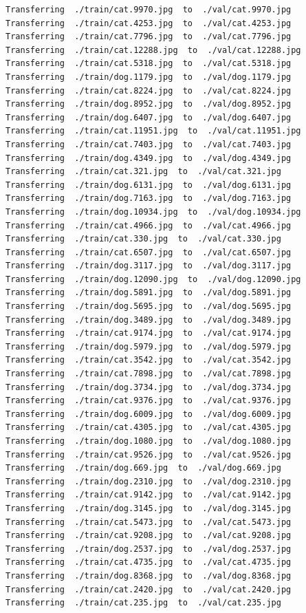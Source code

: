 \documentclass[]{book}
\theoremstyle{definition}
\theoremstyle{definition}
\theoremstyle{definition}
\theoremstyle{remark}
\begin{document}
\begin{verbatim}
Transferring  ./train/cat.9970.jpg  to  ./val/cat.9970.jpg
Transferring  ./train/cat.4253.jpg  to  ./val/cat.4253.jpg
Transferring  ./train/cat.7796.jpg  to  ./val/cat.7796.jpg
Transferring  ./train/cat.12288.jpg  to  ./val/cat.12288.jpg
Transferring  ./train/cat.5318.jpg  to  ./val/cat.5318.jpg
Transferring  ./train/dog.1179.jpg  to  ./val/dog.1179.jpg
Transferring  ./train/cat.8224.jpg  to  ./val/cat.8224.jpg
Transferring  ./train/dog.8952.jpg  to  ./val/dog.8952.jpg
Transferring  ./train/dog.6407.jpg  to  ./val/dog.6407.jpg
Transferring  ./train/cat.11951.jpg  to  ./val/cat.11951.jpg
Transferring  ./train/cat.7403.jpg  to  ./val/cat.7403.jpg
Transferring  ./train/dog.4349.jpg  to  ./val/dog.4349.jpg
Transferring  ./train/cat.321.jpg  to  ./val/cat.321.jpg
Transferring  ./train/dog.6131.jpg  to  ./val/dog.6131.jpg
Transferring  ./train/dog.7163.jpg  to  ./val/dog.7163.jpg
Transferring  ./train/dog.10934.jpg  to  ./val/dog.10934.jpg
Transferring  ./train/cat.4966.jpg  to  ./val/cat.4966.jpg
Transferring  ./train/cat.330.jpg  to  ./val/cat.330.jpg
Transferring  ./train/cat.6507.jpg  to  ./val/cat.6507.jpg
Transferring  ./train/dog.3117.jpg  to  ./val/dog.3117.jpg
Transferring  ./train/dog.12090.jpg  to  ./val/dog.12090.jpg
Transferring  ./train/dog.5891.jpg  to  ./val/dog.5891.jpg
Transferring  ./train/dog.5695.jpg  to  ./val/dog.5695.jpg
Transferring  ./train/dog.3489.jpg  to  ./val/dog.3489.jpg
Transferring  ./train/cat.9174.jpg  to  ./val/cat.9174.jpg
Transferring  ./train/dog.5979.jpg  to  ./val/dog.5979.jpg
Transferring  ./train/cat.3542.jpg  to  ./val/cat.3542.jpg
Transferring  ./train/cat.7898.jpg  to  ./val/cat.7898.jpg
Transferring  ./train/dog.3734.jpg  to  ./val/dog.3734.jpg
Transferring  ./train/cat.9376.jpg  to  ./val/cat.9376.jpg
Transferring  ./train/dog.6009.jpg  to  ./val/dog.6009.jpg
Transferring  ./train/cat.4305.jpg  to  ./val/cat.4305.jpg
Transferring  ./train/dog.1080.jpg  to  ./val/dog.1080.jpg
Transferring  ./train/cat.9526.jpg  to  ./val/cat.9526.jpg
Transferring  ./train/dog.669.jpg  to  ./val/dog.669.jpg
Transferring  ./train/dog.2310.jpg  to  ./val/dog.2310.jpg
Transferring  ./train/cat.9142.jpg  to  ./val/cat.9142.jpg
Transferring  ./train/dog.3145.jpg  to  ./val/dog.3145.jpg
Transferring  ./train/cat.5473.jpg  to  ./val/cat.5473.jpg
Transferring  ./train/cat.9208.jpg  to  ./val/cat.9208.jpg
Transferring  ./train/dog.2537.jpg  to  ./val/dog.2537.jpg
Transferring  ./train/cat.4735.jpg  to  ./val/cat.4735.jpg
Transferring  ./train/dog.8368.jpg  to  ./val/dog.8368.jpg
Transferring  ./train/cat.2420.jpg  to  ./val/cat.2420.jpg
Transferring  ./train/cat.235.jpg  to  ./val/cat.235.jpg

\end{verbatim}
\end{document}
